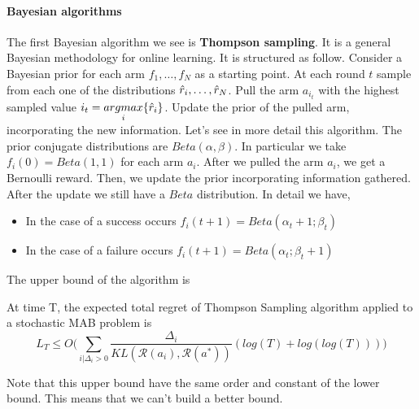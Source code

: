 \documentclass[main.tex]{subfiles}
\begin{document}
\paragraph{Bayesian algorithms}
The first Bayesian algorithm we see is \textbf{Thompson sampling}. It is a general Bayesian methodology for online learning. It is structured as follow.
Consider a Bayesian prior for each arm $f_1,\dots,f_N$ as a starting point. At each round $t$ sample from each one of the distributions $\Hat{r}_i, \dots, \Hat{r}_N$. Pull the arm $a_{i_t}$ with the highest sampled value $i_t = \underset{i}{argmax} \{ \Hat{r}_i \}$. Update the prior of the pulled arm, incorporating the new information.
Let's see in more detail this algorithm. The prior conjugate distributions are $Beta(\alpha, \beta)$. In particular we take $f_i(0)=Beta(1,1)$ for each arm $a_i$. After we pulled the arm $a_i$, we get a Bernoulli reward. Then, we update the prior incorporating information gathered. After the update we still have a $Beta$ distribution. In detail we have,
\begin{itemize}
    \item In the case of a success occurs $f_i(t + 1) = Beta(\alpha_t + 1; \beta_t)$
    \item In the case of a failure occurs $f_i(t + 1) = Beta(\alpha_t; \beta_t + 1)$
\end{itemize}
The upper bound of the algorithm is
\begin{theorem}
At time T, the expected total regret of Thompson Sampling algorithm applied
to a stochastic MAB problem is
\begin{equation*}
    L_T \leq O \Bigg( \sum_{i|\Delta_i > 0} \frac{\Delta_i}{KL(\mathcal{R}(a_i),\mathcal{R}(a^*))} (log(T) + log(log(T))) \Bigg)
\end{equation*}
\end{theorem}
Note that this upper bound have the same order and constant of the lower bound. This means that we can't build a better bound.
\end{document}
